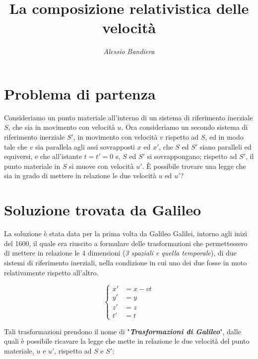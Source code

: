 \documentclass{article}
\begin{document}
\title{\textbf{La composizione relativistica delle velocità}}
\author{\textit{Alessio Bandiera}}
\date{} %

\maketitle

\section{Problema di partenza}
\null\par
Consideriamo un punto materiale all'interno di un sistema
di riferimento inerziale \(S\), che sia in movimento con
velocità \(u\). Ora consideriamo un secondo sistema di
riferimento inerziale \(S'\), in movimento con velocità
\(v\) rispetto ad \(S\), ed in modo tale che  \(v\) sia parallela
agli assi sovrapposti \(x\) ed \(x'\), che \(S\) ed \(S'\) siano
paralleli ed equiversi, e che all'istante \(t=t'=0\) s, \(S\)
ed \(S'\) si sovrappongano; rispetto ad \(S'\), il punto
materiale in \(S\) si muove con velocità \(u'\). \`E possibile
trovare una legge che sia in grado di mettere in relazione
le due velocità \(u\) ed \(u'\)?

\section{Soluzione trovata da Galileo}
La soluzione è stata data per la prima volta da Galileo Galilei,
intorno agli inizi del 1600, il quale era riuscito a formulare
delle trasformazioni che permettessero di mettere in relazione
le 4 dimensioni (\textit{3 spaziali e quella temporale}), di due
sistemi di riferimento inerziali, nella condizione in cui uno
dei due fosse in moto relativamente rispetto all'altro.

\begin{equation}
    \left\{
        \begin{aligned}
        x' &= x - vt \\
        y' &= y \\
        z' &= z \\
        t' &= t
        \end{aligned}
    \right.
\end{equation}

Tali
trasformazioni prendono il nome di "\textbf{\textit{Trasformazioni di Galileo}}",
dalle quali è possibile ricavare la legge che mette in relazione
le due velocità del punto materiale, \(u\) e \(u'\), rispetto
ad \(S\) e \(S'\):
\end{document}
